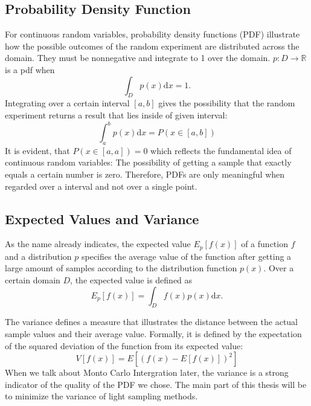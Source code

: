 \subsection{Probability Density Function}

For continuous random variables, probability density functions (PDF) illustrate how the possible outcomes of the random experiment are distributed across the domain. They must be nonnegative and integrate to 1 over the domain. $p:D \rightarrow \mathbb{R}$ is a pdf when
\begin{equation}
\int_{D}p(x)\mathrm{d}x = 1.
\end{equation}
Integrating over a certain interval $[a, b]$ gives the possibility that the random experiment returns a result that lies inside of given interval:
\begin{equation}
\int_{a}^{b}p(x)\mathrm{d}x = P(x \in [a, b])
\end{equation}
It is evident, that $P(x \in [a, a]) = 0$ which reflects the fundamental idea of continuous random variables: The possibility of getting a sample that exactly equals a certain number is zero. Therefore, PDFs are only meaningful when regarded over a interval and not over a single point.

\subsection{Expected Values and Variance}

As the name already indicates, the expected value $E_p[f(x)]$ of a function $f$ and a distribution $p$ specifies the average value of the function after getting a large amount of samples according to the distribution function $p(x)$. Over a certain domain $D$, the expected value is defined as
\begin{equation}
E_p[f(x)] = \int_{D}f(x)p(x)\mathrm{d}x.
\end{equation}

The variance defines a measure that illustrates the distance between the actual sample values and their average value. Formally, it is defined by the expectation of the squared deviation of the function from its expected value:
\begin{equation}
V[f(x)] = E[(f(x) - E[f(x)])^2]
\end{equation}
When we talk about Monto Carlo Intergration later, the variance is a strong indicator of the quality of the PDF we chose. The main part of this thesis will be to minimize the variance of light sampling methods.

